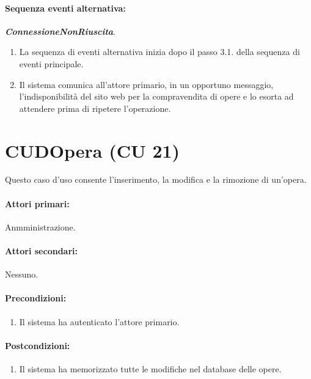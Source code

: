 \documentclass{article}
\begin{document}
	\paragraph{Sequenza eventi alternativa:} \textbf{\textit{ConnessioneNonRiuscita}}.
	\begin{enumerate}[itemsep=8pt,parsep=0pt]
				\item La sequenza di eventi alternativa inizia dopo il passo 3.1. della sequenza di eventi principale.
	\item Il sistema comunica all'attore primario, in un opportuno messaggio, l'indisponibilità del sito web per la compravendita di opere e lo esorta ad attendere prima di ripetere l'operazione.
	\end{enumerate}




	
	
	
	
	\newpage 
	
	 \section*{CUDOpera (CU 21)}
	
	\indent\indent Questo caso d'uso consente l’inserimento, la modifica e la rimozione di un'opera.
	
	\paragraph{Attori primari:}Anmministrazione.
	
	\paragraph{Attori secondari:}Nessuno.
	
	\paragraph{Precondizioni:}
		\begin{enumerate}	[itemsep=8pt,parsep=0pt]
			\item Il sistema ha autenticato l'attore primario.
		\end{enumerate}
	
	\paragraph{Postcondizioni:}
		\begin{enumerate}	[itemsep=8pt,parsep=0pt]
			\item Il sistema ha memorizzato tutte le modifiche nel database delle opere.
		\end{enumerate}
	
\end{document}
